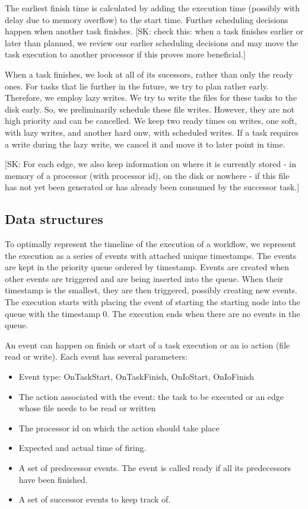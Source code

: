 \documentclass[conference]{IEEEtran}
\newcommand{\skug}[1]{{\color{blue}[SK: #1]}}
\begin{document}
    The earliest finish time is calculated by adding the execution time (possibly with delay due to memory overflow) to the start time.
    Further scheduling decisions happen when another task finishes.
    \skug{check this: when a task finishes earlier or later than planned, we review our earlier scheduling decisions and may
    move the task execution to another processor if this proves more beneficial.}

    When a task finishes, we look at all of its sucessors, rather than only the ready ones.
    For tasks that lie further in the future, we try to plan rather early.
    Therefore, we employ lazy writes.
    We try to write the files for these tasks to the disk early.
    So, we preliminarily schedule these file writes. However, they are not high priority and can be cancelled.
    We keep two ready times on writes, one soft, with lazy writes, and another hard onw, with scheduled writes.
    If a task requires a write during the lazy write, we cancel it and move it to later point in time.

    \skug{For each edge, we also keep information on where it is currently stored - in memory of a processor (with processor id),
        on the disk or nowhere - if this file has not yet been generated or has already been consumed by the successor task.}

\subsection{Data structures }
    To optimally represent the timeline of the execution of a workflow, we represent the execution as a series of events
    with attached unique timestamps.
    The events are kept in the priority queue ordered by timestamp.
    Events are created when other events are triggered and are being inserted into the queue.
    When their timestamp is the smallest, they are then triggered, possibly creating new events.
    The execution starts with placing the event of starting the starting node into the queue with the timestamp 0.
    The execution ends when there are no events in the queue.

    An event can happen on finish or start of a task execution or an io action (file read or write).
    Each event has several parameters:
    \begin{itemize}
        \item Event type: OnTaskStart, OnTaskFinish, OnIoStart, OnIoFinish
        \item The action associated with the event: the task to be executed or an edge whose file needs to be read or written
        \item The processor id on which the action should take place
        \item Expected and actual time of firing.
        \item A set of predecessor events. The event is called ready if all its predecessors have been finished.
        \item A set of successor events to keep track of.
    \end{itemize}
\end{document}
